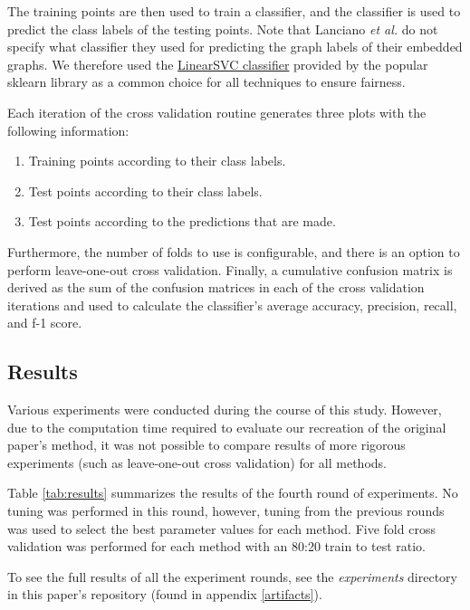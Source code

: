 \documentclass[sigconf]{acmart}
\begin{document}
The training points are then used to train a classifier, and the classifier is used to predict the class labels of the testing points.
Note that Lanciano \emph{et al.} do not specify what classifier they used for predicting the graph labels of their embedded graphs.
We therefore used the \href{https://scikit-learn.org/stable/modules/generated/sklearn.svm.LinearSVC.html}{LinearSVC classifier} provided by the popular sklearn library as a common choice for all techniques to ensure fairness.

Each iteration of the cross validation routine generates three plots with the following information:
\begin{enumerate}
    \item Training points according to their class labels.
    \item Test points according to their class labels.
    \item Test points according to the predictions that are made.
\end{enumerate}
Furthermore, the number of folds to use is configurable, and there is an option to perform leave-one-out cross validation.
Finally, a cumulative confusion matrix is derived as the sum of the confusion matrices in each of the cross validation iterations and used to calculate the classifier's average accuracy, precision, recall, and f-1 score.

\subsection{Results} \label{results}

Various experiments were conducted during the course of this study.
However, due to the computation time required to evaluate our recreation of the original paper's method, it was not possible to compare results of more rigorous experiments (such as leave-one-out cross validation) for all methods.

Table \ref{tab:results} summarizes the results of the fourth round of experiments.
No tuning was performed in this round, however, tuning from the previous rounds was used to select the best parameter values for each method.
Five fold cross validation was performed for each method with an 80:20 train to test ratio.

To see the full results of all the experiment rounds, see the \emph{experiments} directory in this paper's repository (found in appendix \ref{artifacts}).
\end{document}
